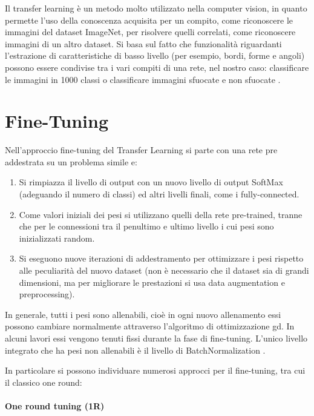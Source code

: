 Il transfer learning è un metodo molto utilizzato nella computer vision, in quanto permette l'uso della conoscenza acquisita per un
compito, come riconoscere le immagini del dataset ImageNet, per risolvere quelli correlati, come riconoscere immagini di un altro dataset. Si basa sul fatto che
funzionalità riguardanti l'estrazione di caratteristiche di basso livello
(per esempio, bordi, forme e angoli) possono essere condivise tra i vari compiti di una rete, nel nostro caso: classificare le immagini in 1000 classi o classificare immagini sfuocate e non sfuocate \cite{patrini_tl}.


\section{Fine-Tuning}\label{fine-tuning}

Nell'approccio fine-tuning del Transfer Learning si parte con una rete pre addestrata su un problema simile e:
\begin{enumerate}
    \item Si rimpiazza il livello di output con un nuovo livello di output \gls{SoftMax} (adeguando il numero di classi) ed altri livelli finali, come i \gls{fully-connected}.
    \item Come valori iniziali dei pesi si utilizzano quelli della rete pre-trained, tranne che per le connessioni tra il penultimo e ultimo livello i cui pesi sono inizializzati random.
    \item Si eseguono nuove iterazioni di addestramento per ottimizzare i pesi rispetto alle peculiarità del nuovo dataset (non è necessario che il dataset sia di grandi dimensioni, ma per migliorare le prestazioni si usa data augmentation e preprocessing).
\end{enumerate}

In generale, tutti i pesi sono allenabili, cioè in  ogni nuovo allenamento essi possono cambiare normalmente attraverso l'algoritmo di ottimizzazione \gls{gd}. In alcuni lavori essi vengono tenuti fissi durante la fase di fine-tuning. L'unico livello integrato che ha pesi non allenabili è il livello di \gls{BatchNormalization} \cite{team_keras_nodate} \cite{lumini_plankton}.

In particolare si possono individuare numerosi approcci per il fine-tuning, tra cui il classico one round:
\paragraph {One round tuning (1R)} \label{one-round-tuning}

